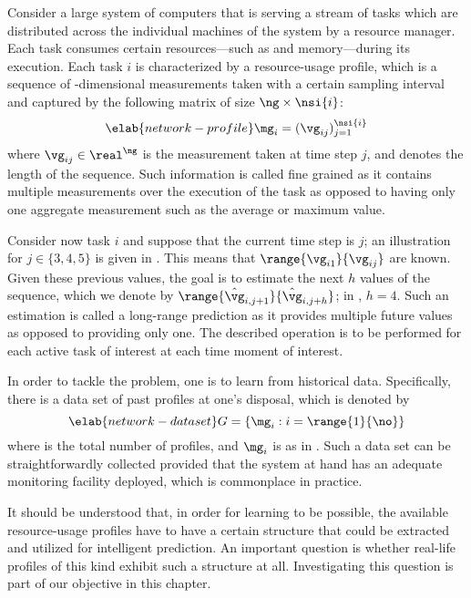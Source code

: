 Consider a large system of computers that is serving a stream of tasks which are
distributed across the individual machines of the system by a resource manager.
Each task consumes certain resources---such as  and memory---during its
execution. Each task $i$ is characterized by a resource-usage profile, which is
a sequence of \ng-dimensional measurements taken with a certain sampling
interval and captured by the following matrix of size $\ng \times \nsi{i}$:
\begin{equation} \elab{network-profile}
  \mg_i = (\vg_{ij})_{j = 1}^\nsi{i}
\end{equation}
where $\vg_{ij} \in \real^\ng$ is the measurement taken at time step $j$, and
 denotes the length of the sequence. Such information is called
fine grained as it contains multiple measurements over the execution of the task
as opposed to having only one aggregate measurement such as the average or
maximum value.

Consider now task $i$ and suppose that the current time step is $j$; an
illustration for $j \in \{3, 4, 5\}$ is given in .
This means that $\range{\vg_{i1}}{\vg_{ij}}$ are known. Given these previous
values, the goal is to estimate the next $h$ values of the sequence, which we
denote by $\range{\hat{\vg}_{i,j + 1}}{\hat{\vg}_{i,j + h}}$; in
, $h = 4$. Such an estimation is called a long-range
prediction as it provides multiple future values as opposed to providing only
one. The described operation is to be performed for each active task of interest
at each time moment of interest.

In order to tackle the problem, one is to learn from historical data.
Specifically, there is a data set of past profiles at one's disposal, which is
denoted by
\begin{equation} \elab{network-dataset}
  G = \left\{ \mg_i: i = \range{1}{\no} \right\}
\end{equation}
where \no is the total number of profiles, and $\mg_i$ is as in
. Such a data set can be straightforwardly collected
provided that the system at hand has an adequate monitoring facility deployed,
which is commonplace in practice.

It should be understood that, in order for learning to be possible, the
available resource-usage profiles have to have a certain structure that could be
extracted and utilized for intelligent prediction. An important question is
whether real-life profiles of this kind exhibit such a structure at all.
Investigating this question is part of our objective in this chapter.
